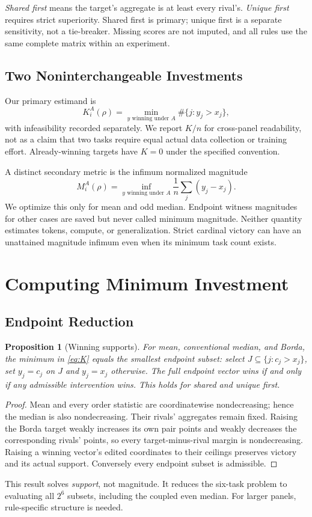 \documentclass{article}
\newtheorem{proposition}[theorem]{Proposition}
\begin{document}
\emph{Shared first} means the target's aggregate is at least every rival's. \emph{Unique first} requires strict superiority. Shared first is primary; unique first is a separate sensitivity, not a tie-breaker. Missing scores are not imputed, and all rules use the same complete matrix within an experiment.

\subsection{Two Noninterchangeable Investments}
Our primary estimand is
\begin{equation}
 K_i^A(\rho)=\min_{y\text{ winning under }A}\!\#\{j:y_j>x_j\},
 \label{eq:K}
\end{equation}
with infeasibility recorded separately. We report $K/n$ for cross-panel readability, not as a claim that two tasks require equal actual data collection or training effort. Already-winning targets have $K=0$ under the specified convention.

A distinct secondary metric is the infimum normalized magnitude
\begin{equation}
 M_i^A(\rho)=\inf_{y\text{ winning under }A}\frac1n\sum_j(y_j-x_j).
 \label{eq:M}
\end{equation}
We optimize this only for mean and odd median. Endpoint witness magnitudes for other cases are saved but never called minimum magnitude. Neither quantity estimates tokens, compute, or generalization. Strict cardinal victory can have an unattained magnitude infimum even when its minimum task count exists.

\section{Computing Minimum Investment}
\subsection{Endpoint Reduction}
\begin{proposition}[Winning supports]
For mean, conventional median, and Borda, the minimum in \eqref{eq:K} equals the smallest endpoint subset: select $J\subseteq\{j:c_j>x_j\}$, set $y_j=c_j$ on $J$ and $y_j=x_j$ otherwise. The full endpoint vector wins if and only if any admissible intervention wins. This holds for shared and unique first.
\label{prop:endpoint}
\end{proposition}
\begin{proof}
Mean and every order statistic are coordinatewise nondecreasing; hence the median is also nondecreasing. Their rivals' aggregates remain fixed. Raising the Borda target weakly increases its own pair points and weakly decreases the corresponding rivals' points, so every target-minus-rival margin is nondecreasing. Raising a winning vector's edited coordinates to their ceilings preserves victory and its actual support. Conversely every endpoint subset is admissible.
\end{proof}
This result solves \emph{support}, not magnitude. It reduces the six-task problem to evaluating all $2^6$ subsets, including the coupled even median. For larger panels, rule-specific structure is needed.
\end{document}
